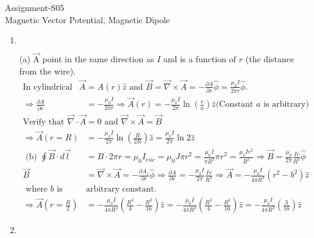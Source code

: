 \begin{abox}
	Assignment-S05\\
	\vspace{0.5cm}
Magnetic Vector Potential, Magnetic Dipole
	\end{abox}
\begin{enumerate}
	\item $\left. \right. $
	\begin{answer}
			(a) $\overrightarrow{\mathrm{A}}$ point in the same direction as $I$ and is a function of $r$ (the distance from the wire).
		\begin{align*}
		\text{In cylindrical coordinates }\vec{A}&=A(r) \hat{z}\text{ and }\vec{B}=\vec{\nabla} \times \vec{A}=-\frac{\partial A}{\partial r} \hat{\phi}=\frac{\mu_{0} I}{2 \pi r} \hat{\phi}.\\
		\Rightarrow \frac{\partial A}{\partial r}&=-\frac{\mu_{0} I}{2 \pi r} \Rightarrow \vec{A}(r)=-\frac{\mu_{0} I}{2 \pi} \ln \left(\frac{r}{a}\right) \hat{z} \text{(Constant $a$ is arbitrary)}\\
		\text{Verify that }\vec{\nabla} \cdot \vec{A}&=0\text{ and }\vec{\nabla} \times \vec{A}=\vec{B}\\
		\Rightarrow \vec{A}(r=R)&=-\frac{\mu_{0} I}{2 \pi} \ln \left(\frac{R}{2 R}\right) \hat{z}=\frac{\mu_{0} I}{2 \pi} \ln 2 \hat{z}\\
	\text{	(b) }\oint \vec{B} \cdot d \vec{l}&=B \cdot 2 \pi r=\mu_{0} I_{e n c}=\mu_{0} J \pi r^{2}=\frac{\mu_{0} I}{\pi R^{2}} \pi r^{2}=\frac{\mu_{0} I r^{2}}{R^{2}} \Rightarrow \vec{B}=\frac{\mu_{0}}{2 \pi} \frac{I r}{R^{2}} \hat{\phi}\\
		\vec{B}&=\vec{\nabla} \times \vec{A}=-\frac{\partial A_{z}}{\partial r} \hat{\phi} \Rightarrow \frac{\partial A}{\partial r}=-\frac{\mu_{0} I}{2 \pi} \frac{I r}{R^{2}} \Rightarrow \vec{A}=-\frac{\mu_{0} I}{4 \pi R^{2}}\left(r^{2}-b^{2}\right) \hat{z}\\
	\text{	where $b$ is }&\text{arbitrary constant.}\\
		\Rightarrow \vec{A}\left(r=\frac{R}{2}\right)&=-\frac{\mu_{0} I}{4 \pi R^{2}}\left(\frac{R^{2}}{4}-\frac{R^{2}}{16}\right) \hat{z}=-\frac{\mu_{0} I}{4 \pi R^{2}}\left(\frac{R^{2}}{4}-\frac{R^{2}}{16}\right) \hat{z}=-\frac{\mu_{0} I}{4 \pi R^{2}}\left(\frac{3}{16}\right) \hat{z}
		\end{align*}
	\end{answer}
	\item  $\left. \right. $
	\begin{answer}$\left. \right. $
		\begin{figure}[H]

\end{figure}
\end{answer}
\end{enumerate}
